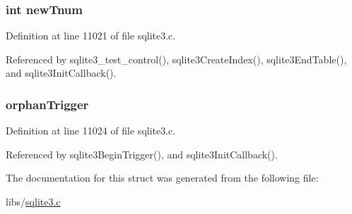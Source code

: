 \subsubsection[{new\+Tnum}]{\setlength{\rightskip}{0pt plus 5cm}int new\+Tnum}\label{structsqlite3_1_1sqlite3_init_info_ab306156f4199316ebe4010f3842af971}


Definition at line 11021 of file sqlite3.\+c.



Referenced by sqlite3\+\_\+test\+\_\+control(), sqlite3\+Create\+Index(), sqlite3\+End\+Table(), and sqlite3\+Init\+Callback().

\hypertarget{structsqlite3_1_1sqlite3_init_info_a7d8e852a59ea07bc9015f5cbe09d1b37}{}
\subsubsection[{orphan\+Trigger}]{ orphan\+Trigger}\label{structsqlite3_1_1sqlite3_init_info_a7d8e852a59ea07bc9015f5cbe09d1b37}


Definition at line 11024 of file sqlite3.\+c.



Referenced by sqlite3\+Begin\+Trigger(), and sqlite3\+Init\+Callback().



The documentation for this struct was generated from the following file\+:\begin{DoxyCompactItemize}
\item 
libs/\hyperlink{sqlite3_8c}{sqlite3.\+c}\end{DoxyCompactItemize}
